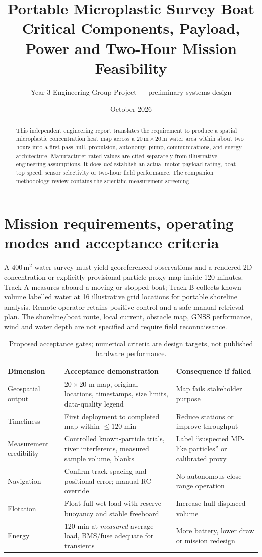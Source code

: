 \documentclass[10pt,a4paper]{article}
\title{\color{navy}\bfseries Portable Microplastic Survey Boat\\[3pt]\large Critical Components, Payload, Power and Two-Hour Mission Feasibility}
\author{Year 3 Engineering Group Project --- preliminary systems design}\date{October 2026}
\begin{document}
\maketitle
\tableofcontents
\begin{abstract}This independent engineering report translates the requirement to produce a spatial microplastic concentration heat map across a $20\,\mathrm{m}\times20\,\mathrm{m}$ water area within about two hours into a first-pass hull, propulsion, autonomy, pump, communications, and energy architecture. Manufacturer-rated values are cited separately from illustrative engineering assumptions. It does \emph{not} establish an actual motor payload rating, boat top speed, sensor selectivity or two-hour field performance. The companion methodology review contains the scientific measurement screening.\end{abstract}
\section{Mission requirements, operating modes and acceptance criteria}
A $400\,\mathrm{m}^2$ water survey must yield georeferenced observations and a rendered 2D concentration or explicitly provisional particle proxy map inside 120 minutes. Track A measures aboard a moving or stopped boat; Track B collects known-volume labelled water at 16 illustrative grid locations for portable shoreline analysis. Remote operator retains positive control and a safe manual retrieval plan. The shoreline/boat route, local current, obstacle map, GNSS performance, wind and water depth are not specified and require field reconnaissance.

\begin{table}[H]\centering\footnotesize
\caption{Proposed acceptance gates; numerical criteria are design targets, not published hardware performance.}
\begin{tabularx}{\linewidth}{@{}L{3.1cm}Y Y@{}}\toprule
Dimension & Acceptance demonstration & Consequence if failed\\\midrule
Geospatial output & $20\times20$ m map, original locations, timestamps, size limits, data-quality legend & Map fails stakeholder purpose\\
Timeliness & First deployment to completed map within $\leq120$ min & Reduce stations or improve throughput\\
Measurement credibility & Controlled known-particle trials, river interferents, measured sample volume, blanks & Label ``suspected MP-like particles'' or calibrated proxy\\
Navigation & Confirm track spacing and positional error; manual RC override & No autonomous close-range operation\\
Flotation & Float full wet load with reserve buoyancy and stable freeboard & Increase hull displaced volume\\
Energy & 120 min at \emph{measured} average load, BMS/fuse adequate for transients & More battery, lower draw or mission redesign\\\bottomrule\end{tabularx}\end{table}
\end{document}
